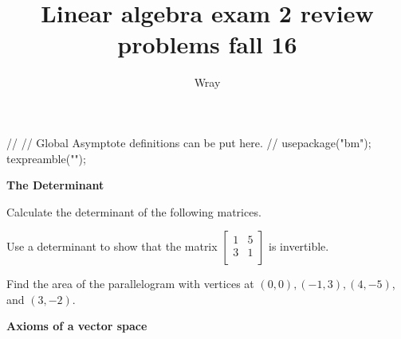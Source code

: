 \documentclass[12pt]{exam}
\title{Linear algebra exam 2 review problems fall 16}
\author{Wray}
\begin{document}
\begin{asydef}
//
// Global Asymptote definitions can be put here.
//
usepackage("bm");
texpreamble("\def\V#1{\bm{#1}}");
\end{asydef}

\bigskip
\bigskip

\textbf{The Determinant}
\smallskip

\begin{questions}

\question
Calculate the determinant of the following matrices.
\smallskip


\question
Use a determinant to show that the matrix 
$\left[ \begin{array}{cc}
1 & 5 \\ 3 & 1 \\
\end{array} \right]$
is invertible.

\question
Find the area of the parallelogram with vertices at $(0,0), (-1,3), (4,-5)$, and $(3,-2)$.

\end{questions}

\bigskip

\textbf{Axioms of a vector space}
\smallskip
\end{document}
